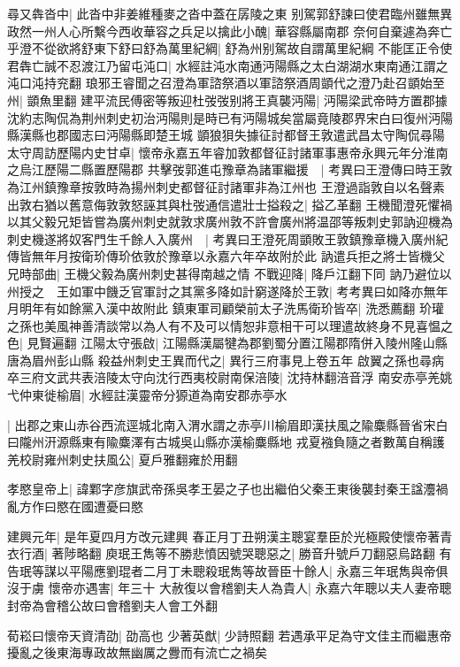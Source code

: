 尋又犇沓中|{
	此沓中非姜維種麥之沓中蓋在孱陵之東}
别駕郭舒諫曰使君臨州雖無異政然一州人心所繫今西收華容之兵足以擒此小醜|{
	華容縣屬南郡}
奈何自棄遽為奔亡乎澄不從欲將舒東下舒曰舒為萬里紀綱|{
	舒為州别駕故自謂萬里紀綱}
不能匡正令使君犇亡誠不忍渡江乃留屯沌口|{
	水經註沌水南通沔陽縣之太白湖湖水東南通江謂之沌口沌持兖翻}
琅邪王睿聞之召澄為軍諮祭酒以軍諮祭酒周顗代之澄乃赴召顗始至州|{
	顗魚里翻}
建平流民傅密等叛迎杜弢弢别將王真襲沔陽|{
	沔陽梁武帝時方置郡據沈約志陶侃為荆州刺史初治沔陽則是時已有沔陽城矣當屬竟陵郡界宋白曰復州沔陽縣漢縣也郡國志曰沔陽縣即楚王城}
顗狼狽失據征討都督王敦遣武昌太守陶侃尋陽太守周訪歷陽内史甘卓|{
	懷帝永嘉五年睿加敦都督征討諸軍事惠帝永興元年分淮南之烏江歷陽二縣置歷陽郡}
共擊弢郭進屯豫章為諸軍繼援　|{
	考異曰王澄傳曰時王敦為江州鎮豫章按敦時為揚州刺史都督征討諸軍非為江州也}
王澄過詣敦自以名聲素出敦右猶以舊意侮敦敦怒誣其與杜弢通信遣壯士搤殺之|{
	搤乙革翻}
王機聞澄死懼禍以其父毅兄矩皆嘗為廣州刺史就敦求廣州敦不許會廣州將温邵等叛刺史郭訥迎機為刺史機遂將奴客門生千餘人入廣州　|{
	考異曰王澄死周顗敗王敦鎮豫章機入廣州紀傳皆無年月按衛玠傳玠依敦於豫章以永嘉六年卒故附於此}
訥遣兵拒之將士皆機父兄時部曲|{
	王機父毅為廣州刺史甚得南越之情}
不戰迎降|{
	降戶江翻下同}
訥乃避位以州授之　王如軍中饑乏官軍討之其黨多降如計窮遂降於王敦|{
	考考異曰如降亦無年月明年有如餘黨入漢中故附此}
鎮東軍司顧榮前太子洗馬衛玠皆卒|{
	洗悉薦翻}
玠瓘之孫也美風神善清談常以為人有不及可以情恕非意相干可以理遣故終身不見喜愠之色|{
	見賢遍翻}
江陽太守張啟|{
	江陽縣漢屬犍為郡劉蜀分置江陽郡隋併入陵州隆山縣唐為眉州彭山縣}
殺益州刺史王異而代之|{
	異行三府事見上卷五年}
啟翼之孫也尋病卒三府文武共表涪陵太守向沈行西夷校尉南保涪陵|{
	沈持林翻涪音浮}
南安赤亭羌姚弋仲東徙榆眉|{
	水經註漢靈帝分獂道為南安郡赤亭水}


|{
	出郡之東山赤谷西流逕城北南入渭水謂之赤亭川榆眉即漢扶風之隃麋縣晉省宋白曰隴州汧源縣東有隃麋澤有古城吳山縣亦漢榆麋縣地}
戎夏襁負隨之者數萬自稱護羌校尉雍州刺史扶風公|{
	夏戶雅翻雍於用翻}


孝愍皇帝上|{
	諱鄴字彦旗武帝孫吳孝王晏之子也出繼伯父秦王東後襲封秦王諡灋禍亂方作曰愍在國遭憂曰愍}


建興元年|{
	是年夏四月方改元建興}
春正月丁丑朔漢主聰宴羣臣於光極殿使懷帝著青衣行酒|{
	著陟略翻}
庾珉王雋等不勝悲憤因號哭聰惡之|{
	勝音升號戶刀翻惡烏路翻}
有告珉等謀以平陽應劉琨者二月丁未聰殺珉雋等故晉臣十餘人|{
	永嘉三年珉雋與帝俱沒于虜}
懷帝亦遇害|{
	年三十}
大赦復以會稽劉夫人為貴人|{
	永嘉六年聰以夫人妻帝聰封帝為會稽公故曰會稽劉夫人會工外翻}


荀崧曰懷帝天資清劭|{
	劭高也}
少著英猷|{
	少詩照翻}
若遇承平足為守文佳主而繼惠帝擾亂之後東海專政故無幽厲之釁而有流亡之禍矣

